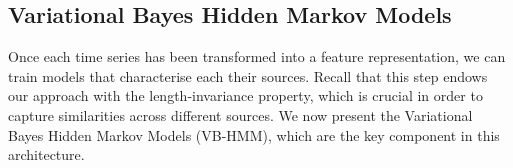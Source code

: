 \documentclass[pdftex,11pt,a4paper]{article}
\theoremstyle{definition}
\theoremstyle{remark}
\begin{document}
\subsection{Variational Bayes Hidden Markov Models} \label{sub_hmms}
Once each time series has been transformed into a feature representation, we can train models that characterise each their sources. Recall that this step endows our approach with the length-invariance property, which is crucial in order to capture similarities across different sources. We now present the Variational Bayes Hidden Markov Models (VB-HMM), which are the key component in this architecture.

\end{document}
